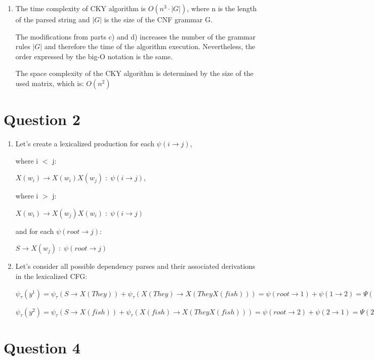 \documentclass{article}
\begin{document}
\begin{enumerate}[label = (\alph*)]
	\item
	The time complexity of CKY algorithm is $O(n^3 \cdot |G|)$, 
	where n is the length of the parsed string and $|G|$ is the size of the CNF grammar G.
	
	The modifications from parts c) and d) increases the number of the grammar rules $|G|$ and therefore the time of the algorithm execution. Nevertheless, the order expressed by the big-O notation is the same. 
	
	The space complexity of the CKY algorithm is determined by the size of the used matrix, which is: $O(n^2)$
     
\end{enumerate}


\clearpage
\newpage
\section*{Question 2} 
\begin{enumerate}[label = (\alph*)]
    \item
    Let's create a lexicalized production for each $\psi(i \to j)$,
     
    where i $<$ j: 
    
    $X(w_i) \to X(w_i)X(w_j) \; : \; \psi(i \to j)$,
    
    where i $>$ j: 
    
    $X(w_i) \to X(w_j)X(w_i) \; : \; \psi(i \to j)$
    
    and for each $\psi(root \to j)$:
    
    $S \to X(w_j) \; : \; \psi(root \to j)$
    
    \item
    Let's consider all possible dependency parses and their associated
derivations in the lexicalized CFG:

	$\psi_\tau(y^1) = \psi_\tau(S \to X(They)) + \psi_\tau(X(They) \to X(They X(fish))) = \psi(root \to 1) + \psi(1 \to 2) = \Psi(1 \to 2)$
	
		$\psi_\tau(y^2) = \psi_\tau(S \to X(fish)) + \psi_\tau(X(fish) \to X(They X(fish))) = \psi(root \to 2) + \psi(2 \to 1) = \Psi(2 \to 1)$
    
\end{enumerate}

\clearpage
\newpage
\section*{Question 4} 
\end{document}
